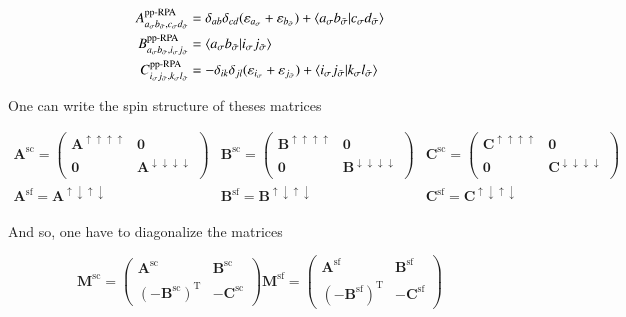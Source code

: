 \documentclass[aip,jcp,reprint,noshowkeys,superscriptaddress]{revtex4-1}
\newcommand{\ppRPA}{\text{pp-RPA}}
\newcommand{\e}[1]{\eps_{#1}}
\newcommand{\bO}{\mathbf{0}}
\newcommand{\bA}[2]{\mathbf{A}_{#1}^{#2}}
\newcommand{\bB}[2]{\mathbf{B}_{#1}^{#2}}
\newcommand{\bC}[2]{\mathbf{C}_{#1}^{#2}}
\newcommand{\bM}[2]{\mathbf{M}_{#1}^{#2}}
\newcommand{\eps}{\varepsilon}
\newcommand{\sig}{\sigma}
\newcommand{\bsig}{{\Bar{\sigma}}}
\newcommand{\up}{\uparrow}
\newcommand{\dw}{\downarrow}
\newcommand{\spc}{\text{sc}}
\newcommand{\spf}{\text{sf}}
\begin{document}
\begin{subequations}
\begin{align}
	A_{a_\sig b_\bsig,c_\sig d_\bsig}^{\ppRPA} & = \delta_{ab} \delta_{cd} (\e{a_\sig} + \e{b_\bsig}) + \braket{a_\sig b_\bsig}{c_\sig d_\bsig}
	\\ 
	B_{a_\sig b_\bsig,i_\sig j_\bsig}^{\ppRPA} & = \braket{a_\sig b_\bsig }{i_\sig j_\bsig}
	\\ 
	C_{i_\sig j_\bsig,k_\sig l_\bsig}^{\ppRPA} & = - \delta_{ik} \delta_{jl} (\e{i_\sig} + \e{j_\bsig}) + \braket{i_\sig j_\bsig}{k_\sig l_\bsig}
\end{align}
\end{subequations}

One can write the spin structure of theses matrices 

\begin{subequations}
\begin{align}
\bA{}{\spc} =
 \begin{pmatrix}
 \bA{}{\up\up\up\up}  & \bO\\
 \bO & \bA{}{\dw\dw\dw\dw}
\end{pmatrix}
&
\bB{}{\spc}= \begin{pmatrix}
 \bB{}{\up\up\up\up} & \bO\\
\bO &  \bB{}{\dw\dw\dw\dw}
\end{pmatrix}
& 
\bC{}{\spc}= \begin{pmatrix}
 \bC{}{\up\up\up\up} &\bO\\
 \bO & \bC{}{\dw\dw\dw\dw}
\end{pmatrix}
\\
\bA{}{\spf} =
  \bA{}{\up\dw\up\dw} 
& 
\bB{}{\spf}= 
 \bB{}{\up\dw\up\dw}
& 
\bC{}{\spf}= 
 \bC{}{\up\dw\up\dw} 
\end{align}
\end{subequations}

And so, one have to diagonalize the matrices 

\begin{equation}
\bM{}{\spc} = 
\begin{pmatrix}
\bA{}{\spc} & \bB{}{\spc} \\
(-\bB{}{\spc})^{\text{T}} & -\bC{}{\spc}
\end{pmatrix}
%
\bM{}{\spf} = 
\begin{pmatrix}
\bA{}{\spf} & \bB{}{\spf} \\
(-\bB{}{\spf})^{\text{T}} & -\bC{}{\spf}
\end{pmatrix}
\end{equation}
\end{document}
